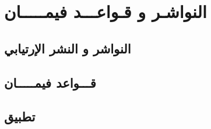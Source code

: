 
\chapter{النواشـر و قـواعـــد فيمـــــان} %

\label{Chapter3} 
\section{النواشر و النشر الإرتيابي}

\section{قـــواعد فيمـــــان}

\section{تطبيق}
 